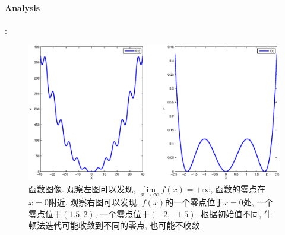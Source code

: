 \documentclass{article}
\begin{document}
\begin{CJK*}{UTF8}{song}
			\paragraph{Analysis}:\newline
			\begin{figure}[H]
				\centering
				\includegraphics[width=1.0\textwidth]{../chapter2_3_1.eps}
				\caption{函数图像. 观察左图可以发现, $\lim\limits_{x \to \infty}f\left(x\right) = + \infty$, 函数的零点在$x=0$附近. 观察右图可以发现, $f\left(x\right)$的一个零点位于$x=0$处, 一个零点位于$\left(1.5,2\right)$, 一个零点位于$\left(-2,-1.5\right)$. 根据初始值不同, 牛顿法迭代可能收敛到不同的零点, 也可能不收敛.}
				\label{img_chapter2_3_1}
			\end{figure}

\end{CJK*}
\end{document}
